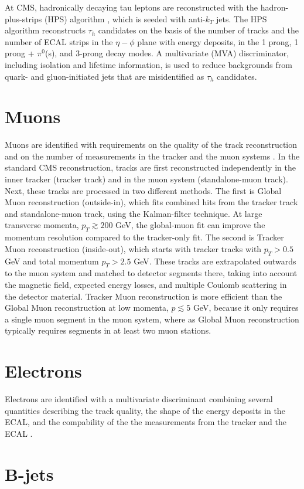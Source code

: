 At CMS, hadronically decaying tau leptons are reconstructed with the hadron-plus-strips (HPS) algorithm \citep{CMS-TAU-14-001}, which is seeded with anti-$k_T$ jets. The HPS algorithm reconstructs $\tau_{h}$ candidates on the basis of the number of tracks and the number of ECAL strips in the $\eta-\phi$ plane with energy deposits, in the 1 prong, 1 prong + $\pi^0$(s), and 3-prong decay modes. A multivariate (MVA) discriminator, including isolation and lifetime information, is used to reduce backgrounds from quark- and gluon-initiated jets that are misidentified as $\tau_{h}$ candidates. 

\section{Muons}
Muons are identified with requirements on the quality of the track reconstruction and on the number of measurements in the tracker and the muon systems \citep{CMS-MUO-10-004}. In the standard CMS reconstruction, tracks are first reconstructed independently in the inner tracker (tracker track) and in the muon system (standalone-muon track). Next, these tracks are processed in two different methods. The first is Global Muon reconstruction (outside-in), which fits combined hits from the tracker track and standalone-muon track, using the Kalman-filter technique. At large transverse momenta, $p_{T} \gtrsim 200$ GeV, the global-muon fit can improve the momentum resolution compared to the tracker-only fit.  The second is Tracker Muon reconstruction (inside-out), which starts with tracker tracks with $p_{T} > 0.5$ GeV and total momentum $p_{T} > 2.5$ GeV. These tracks are extrapolated outwards to the muon system and matched to detector segments there, taking into account the magnetic field, expected energy losses, and multiple Coulomb scattering in the detector material. Tracker Muon reconstruction is more efficient than the Global Muon reconstruction at low momenta, $p \lesssim 5$ GeV, because it only requires a single muon segment in the muon system, where as Global Muon reconstruction typically requires segments in at least two muon stations.

\section{Electrons}
Electrons are identified with a multivariate discriminant combining several quantities describing the track quality, the shape of the energy deposits in the ECAL, and the compability of the the measurements from the tracker and the ECAL \citep{JINST-2015-10-P06005}.


\section{B-jets}



